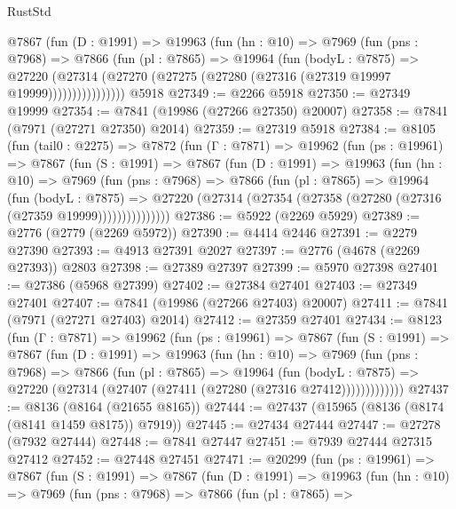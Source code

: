 \begin{lexlean}{RustStd}
\begin{coremodule}
{\begin{coremodule}
{{{{{{{{{{{{{{{{{{{{{{{{{{{{{{{{{{{{{{{{{{{{{{{{{{{{{{            @7867
              (fun (D : @1991) =>
              @19963
                (fun (hn : @10) =>
                @7969
                  (fun (pns : @7968) =>
                  @7866
                    (fun (pl : @7865) =>
                    @19964
                      (fun (bodyL : @7875) =>
                      @27220
                        (@27314
                          (@27270 (@27275 (@27280 (@27316 (@27319 @19997 @19999))))))))))))))))
    @5918
@27349 := @2266 @5918
@27350 := @27349 @19999
@27354 := @7841 (@19986 (@27266 @27350) @20007)
@27358 := @7841 (@7971 (@27271 @27350) @2014)
@27359 := @27319 @5918
@27384 := @8105
    (fun (tail0 : @2275) =>
    @7872
      (fun (Γ : @7871) =>
      @19962
        (fun (ps : @19961) =>
        @7867
          (fun (S : @1991) =>
          @7867
            (fun (D : @1991) =>
            @19963
              (fun (hn : @10) =>
              @7969
                (fun (pns : @7968) =>
                @7866
                  (fun (pl : @7865) =>
                  @19964
                    (fun (bodyL : @7875) =>
                    @27220 (@27314 (@27354 (@27358 (@27280 (@27316 (@27359 @19999)))))))))))))))
@27386 := @5922 (@2269 @5929)
@27389 := @2776 (@2779 (@2269 @5972))
@27390 := @4414 @2446
@27391 := @2279 @27390
@27393 := @4913 @27391 @2027
@27397 := @2776 (@4678 (@2269 @27393)) @2803
@27398 := @27389 @27397
@27399 := @5970 @27398
@27401 := @27386 (@5968 @27399)
@27402 := @27384 @27401
@27403 := @27349 @27401
@27407 := @7841 (@19986 (@27266 @27403) @20007)
@27411 := @7841 (@7971 (@27271 @27403) @2014)
@27412 := @27359 @27401
@27434 := @8123
    (fun (Γ : @7871) =>
    @19962
      (fun (ps : @19961) =>
      @7867
        (fun (S : @1991) =>
        @7867
          (fun (D : @1991) =>
          @19963
            (fun (hn : @10) =>
            @7969
              (fun (pns : @7968) =>
              @7866
                (fun (pl : @7865) =>
                @19964
                  (fun (bodyL : @7875) =>
                  @27220 (@27314 (@27407 (@27411 (@27280 (@27316 @27412)))))))))))))
@27437 := @8136 (@8164 (@21655 @8165))
@27444 := @27437 (@15965 (@8136 (@8174 (@8141 @1459 @8175)) @7919))
@27445 := @27434 @27444
@27447 := @27278 (@7932 @27444)
@27448 := @7841 @27447
@27451 := @7939 @27444 @27315 @27412
@27452 := @27448 @27451
@27471 := @20299
    (fun (ps : @19961) =>
    @7867
      (fun (S : @1991) =>
      @7867
        (fun (D : @1991) =>
        @19963
          (fun (hn : @10) =>
          @7969
            (fun (pns : @7968) =>
            @7866
              (fun (pl : @7865) =>
}}}}}}}}}}}}}}}}}}}}}}}}}}}}}}}}}}}}}}}}}}}}}}}}}}}}}}
\end{coremodule}}
\end{coremodule}
\end{lexlean}
